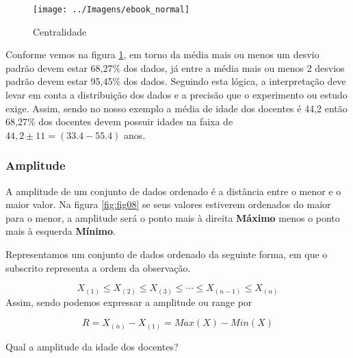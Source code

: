 \documentclass[11pt,]{style/krantz}
\makeatletter
\newenvironment{Shaded}{\begin{snugshade}}{\end{snugshade}}
\newcommand{\CommentTok}[1]{\textcolor[rgb]{0.56,0.35,0.01}{\textit{#1}}}
\newcommand{\DataTypeTok}[1]{\textcolor[rgb]{0.13,0.29,0.53}{#1}}
\newcommand{\DecValTok}[1]{\textcolor[rgb]{0.00,0.00,0.81}{#1}}
\newcommand{\KeywordTok}[1]{\textcolor[rgb]{0.13,0.29,0.53}{\textbf{#1}}}
\newcommand{\NormalTok}[1]{#1}
\newcommand{\OperatorTok}[1]{\textcolor[rgb]{0.81,0.36,0.00}{\textbf{#1}}}
\newcommand{\OtherTok}[1]{\textcolor[rgb]{0.56,0.35,0.01}{#1}}
\newcommand{\StringTok}[1]{\textcolor[rgb]{0.31,0.60,0.02}{#1}}
\newenvironment{kframe}{%
\medskip{}
\setlength{\fboxsep}{.8em}
 \def\at@end@of@kframe{}%
 \ifinner\ifhmode%
  \def\at@end@of@kframe{\end{minipage}}%
  \begin{minipage}{\columnwidth}%
 \fi\fi%
 \def\FrameCommand##1{\hskip\@totalleftmargin \hskip-\fboxsep
 \colorbox{shadecolor}{##1}\hskip-\fboxsep
     \hskip-\linewidth \hskip-\@totalleftmargin \hskip\columnwidth}%
 \MakeFramed {\advance\hsize-\width
   \@totalleftmargin\z@ \linewidth\hsize
   \@setminipage}}%
 {\par\unskip\endMakeFramed%
 \at@end@of@kframe}
\renewenvironment{Shaded}{\begin{kframe}}{\end{kframe}}
\theoremstyle{definition}
\theoremstyle{definition}
\theoremstyle{definition}
\theoremstyle{remark}
\let\BeginKnitrBlock\begin \let\EndKnitrBlock\end
\makeatother
\begin{document}
\begin{figure}[H]

{\centering \texttt{[image: ../Imagens/ebook\_normal]}

}

\caption{Centralidade}\label{fig:fig09}
\end{figure}

Conforme vemos na figura \ref{fig:fig09}, em torno da média mais ou menos um desvio padrão devem estar 68,27\% dos dados, já entre a média mais ou menos 2 desvios padrão devem estar 95,45\% dos dados. Seguindo esta lógica, a interpretação deve levar em conta a distribuição dos dados e a precisão que o experimento ou estudo exige. Assim, sendo no nosso exemplo a média de idade dos docentes é 44,2 então 68,27\% dos docentes devem possuir idades na faixa de \(44,2 \pm 11 = (33.4-55.4)\) anos.

\hypertarget{amplitude}{%
\subsubsection{Amplitude}\label{amplitude}}

A amplitude de um conjunto de dados ordenado é a distância entre o menor e o maior valor. Na figura \ref{fig:fig08} se seus valores estiverem ordenados do maior para o menor, a amplitude será o ponto mais à direita \textbf{Máximo} menos o ponto mais à esquerda \textbf{Mínimo}.

Representamos um conjunto de dados ordenado da seguinte forma, em que o subscrito representa a ordem da observação.

\[X_{(1)}\leq X_{(2)}\leq X_{(3)}\leq \cdots \leq X_{(n-1)}\leq X_{(n)}\]
Assim, sendo podemos expressar a amplitude ou range por

\[R = X_{(n)} - X_{(1)} = Max(X) - Min(X)\]

\BeginKnitrBlock{example}
\protect\hypertarget{exm:unnamed-chunk-65}{}{\label{exm:unnamed-chunk-65} }Qual a amplitude da idade dos docentes?
\EndKnitrBlock{example}

\begin{Shaded}
\end{Shaded}
\end{document}
